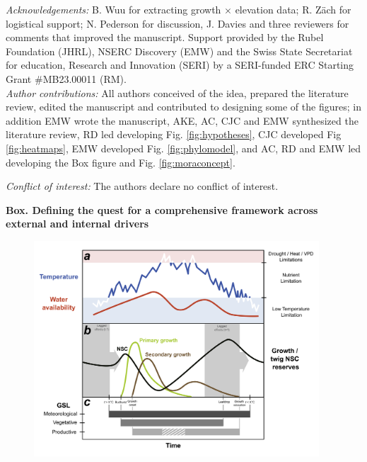 \documentclass[11pt]{article}
\begin{document}

\emph{Acknowledgements:} B. Wuu for extracting growth $\times$ elevation data; R. Z{\"a}ch for logistical support; N. Pederson for discussion, J. Davies and three reviewers for comments that improved the manuscript. Support provided by the Rubel Foundation (JHRL), NSERC Discovery (EMW) and the Swiss State Secretariat for education, Research and Innovation (SERI) by a SERI-funded ERC Starting Grant #MB23.00011 (RM). \\

\emph{Author contributions:}  All authors conceived of the idea, prepared the literature review, edited the manuscript and contributed to designing some of the figures; in addition EMW wrote the manuscript, AKE, AC, CJC  and EMW synthesized the literature review, RD led developing Fig. \ref{fig:hypotheses}, CJC developed Fig \ref{fig:heatmaps}, EMW developed Fig. \ref{fig:phylomodel}, and AC, RD and EMW led developing the Box figure and Fig. \ref{fig:moraconcept}. 

\emph{Conflict of interest:} The authors declare no conflict of interest.  

\newpage
{\bf Box. Defining the quest for a comprehensive framework across external and internal drivers}
\begin{figure}[h!]
\includegraphics[width=0.95\textwidth]{..//figures/gslconcept/NEW_FI~1_ac_ver3.1.png}
\label{fig:defineGSLgrowth}
\end{figure}
\end{document}

